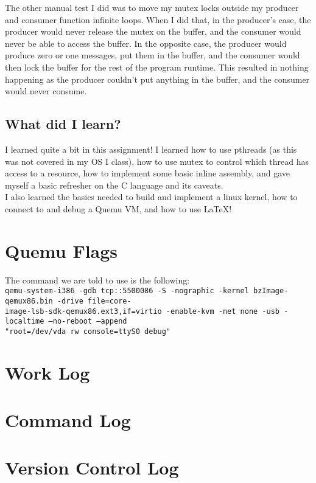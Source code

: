 \documentclass[10pt,letterpaper]{article}
\begin{document}
  \noindent The other manual test I did was to move my mutex locks outside my
  producer and consumer function infinite loops. When I did that, in the producer's
  case, the producer would never release the mutex on the buffer, and the consumer
  would never be able to access the buffer. In the opposite case, the producer
  would produce zero or one messages, put them in the buffer, and the consumer
  would then lock the buffer for the rest of the program runtime. This resulted
  in nothing happening as the producer couldn't put anything in the buffer, and
  the consumer would never consume.

  \subsection{What did I learn?}
  I learned quite a bit in this assignment! I learned how to use pthreads (as this
  was not covered in my OS I class), how to use mutex to control which thread
  has access to a resource, how to implement some basic inline assembly, and
  gave myself a basic refresher on the C language and its caveats. \\

  \noindent I also learned the basics needed to build and implement a linux kernel,
  how to connect to and debug a Quemu VM, and how to use \LaTeX{}!

\section{Quemu Flags}
  The command we are told to use is the following: \\

  \noindent \texttt{qemu-system-i386 -gdb tcp::5500086 -S -nographic -kernel
      bzImage-qemux86.bin -drive file=core-\\image-lsb-sdk-qemux86.ext3,if=virtio
      -enable-kvm -net none -usb -localtime --no-reboot --append\\ "root=/dev/vda
      rw console=ttyS0 debug"}
\section{Work Log}

\section{Command Log}

\section{Version Control Log}

\clearpage



\end{document}
